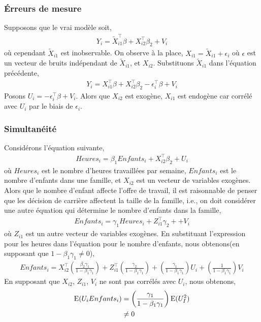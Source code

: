 \subsubsection*{\'Erreurs de mesure}
Supposons que le vrai modèle soit,
\begin{align*}
Y_i = \tilde{X}_{i1}^\top\beta + X_{i2}^\top\beta_2 + V_i
\end{align*}
où cependant $\tilde{X}_{i1}$ est inobservable. On observe à la place, $X_{i1} =  \tilde{X}_{i1}+\epsilon_i$ où $\epsilon$ est un vecteur de bruits indépendant de $\tilde{X}_{i1}$, et $X_{i2}$. Substituons $\tilde{X}_{i1}$ dans l'équation précédente,
\begin{align*}
Y_i = X_{i1} ^\top\beta + X_{i2}^\top\beta_2 - \epsilon_i^\top\beta + V_i
\end{align*}
Posons $U_i = - \epsilon_i^\top\beta + V_i$. Alors que $ X_{i2}$ est exogène, $X_{i1}$ est endogène car  corrélé avec $U_i$ par le biais de $\epsilon_i$.
\subsubsection*{Simultanéité}
Considérons l'équation suivante,
\begin{align*}
Heures_i = \beta_1Enfants_i + X_{i2}^\top\beta_2 + U_i
\end{align*}
où $Heures_i$ est le nombre d'heures travaillées par semaine, $Enfants_i$ est le nombre d'enfants dans une famille, et $X_{i2}$ est un vecteur de variables exogènes. Alors que le nombre d'enfant affecte l'offre de travail, il est raisonnable de penser que les décision de carrière affectent la taille de la famille, i.e., on doit considérer une autre équation qui détermine le nombre d'enfants dans la famille,
\begin{align*}
Enfants_i = \gamma_1 Heures_i + Z_{i1}^\top\gamma_2+ + V_i
\end{align*}
où $ Z_{i1}$ est un autre vecteur de variables exogènes. En substituant l'expression pour les heures dans l'équation pour le nombre d'enfants, nous obtenons(en supposant que $1-\beta_1\gamma_1\neq 0$),
\begin{align*}
Enfants_i  = X_{i2}^\top\left(\frac{\beta_2\gamma_1}{1-\beta_1\gamma_1}\right) + Z_{i1}^\top \left(\frac{\gamma_2}{1-\beta_1\gamma_1}\right) + \left(\frac{\gamma_1}{1-\beta_1\gamma_1}\right)U_i + \left(\frac{1}{1-\beta_1\gamma_1}\right)V_i
\end{align*}
En supposant que $X_{i2}$, $Z_{i1}$, $V_i$ ne sont pas corrélés avec $U_i$, nous obtenons,
\begin{align*}
\operatorname{E}(U_iEnfants_i) &= \left(\frac{\gamma_1}{1-\beta_1\gamma_1}\right)\operatorname{E}(U_I^2)\\
&\neq 0
\end{align*}

